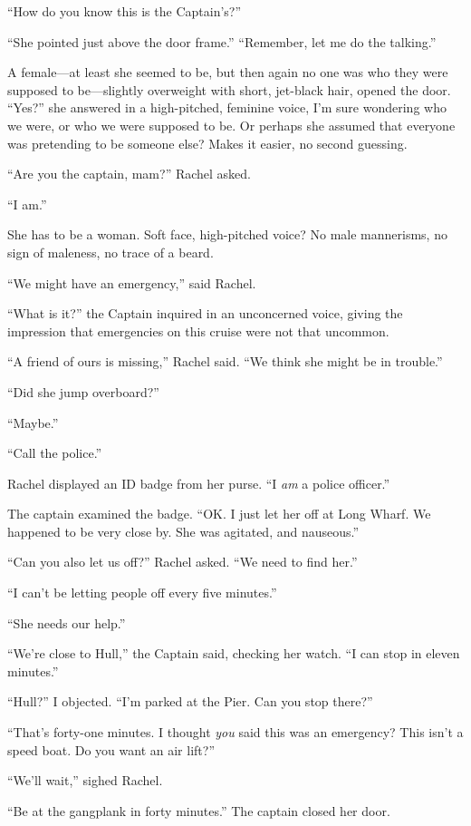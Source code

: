 ``How do you know this is the Captain's?''

``She pointed just above the door frame.'' ``Remember, let me do the
talking.''

A female---at least she seemed to be, but then again no one was who they
were supposed to be---slightly overweight with short, jet-black hair,
opened the door. ``Yes?'' she answered in a high-pitched, feminine
voice, I'm sure wondering who we were, or who we were supposed to be. Or
perhaps she assumed that everyone was pretending to be someone else?
Makes it easier, no second guessing.

``Are you the captain, mam?'' Rachel asked.

``I am.''

She has to be a woman. Soft face, high-pitched voice? No male
mannerisms, no sign of maleness, no trace of a beard.

``We might have an emergency,'' said Rachel.

``What is it?'' the Captain inquired in an unconcerned voice, giving the
impression that emergencies on this cruise were not that uncommon.

``A friend of ours is missing,'' Rachel said. ``We think she might be in
trouble.''

``Did she jump overboard?''

``Maybe.''

``Call the police.''

Rachel displayed an ID badge from her purse. ``I \emph{am} a police
officer.''

The captain examined the badge. ``OK. I just let her off at Long Wharf.
We happened to be very close by. She was agitated, and nauseous.''

``Can you also let us off?'' Rachel asked. ``We need to find her.''

``I can't be letting people off every five minutes.''

``She needs our help.''

``We're close to Hull,'' the Captain said, checking her watch. ``I can
stop in eleven minutes.''

``Hull?'' I objected. ``I'm parked at the Pier. Can you stop there?''

``That's forty-one minutes. I thought \emph{you} said this was an
emergency? This isn't a speed boat. Do you want an air lift?''

``We'll wait,'' sighed Rachel.

``Be at the gangplank in forty minutes.'' The captain closed her door.

